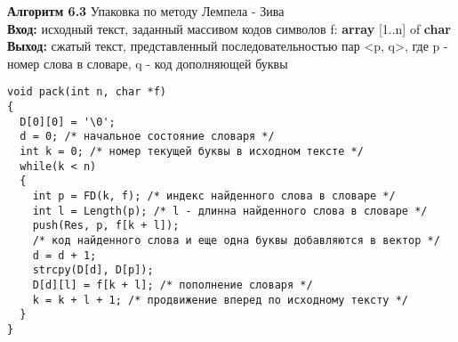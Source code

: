 \documentclass[10pt, a5paper]{article}
\begin{document}

\noindent\textbf{Алгоритм 6.3} Упаковка по методу Лемпела - Зива\\
\noindent\textbf{Вход:} исходный текст, заданный массивом кодов символов f:
\textbf{array} [1..n] of \textbf{char}\\
\noindent\textbf{Выход:} сжатый текст, представленный последовательностью пар <p, q>,
где p - номер слова в словаре, q - код дополняющей буквы
\begin{lstlisting}
void pack(int n, char *f)
{
  D[0][0] = '\0';
  d = 0; /* начальное состояние словаря */
  int k = 0; /* номер текущей буквы в исходном тексте */
  while(k < n)
  {
    int p = FD(k, f); /* индекс найденного слова в словаре */
    int l = Length(p); /* l - длинна найденного слова в словаре */
    push(Res, p, f[k + l]);
    /* код найденного слова и еще одна буквы добавляются в вектор */
    d = d + 1;
    strcpy(D[d], D[p]);
    D[d][l] = f[k + l]; /* пополнение словаря */
    k = k + l + 1; /* продвижение вперед по исходному тексту */
  }
}
\end{lstlisting}
\end{document}
